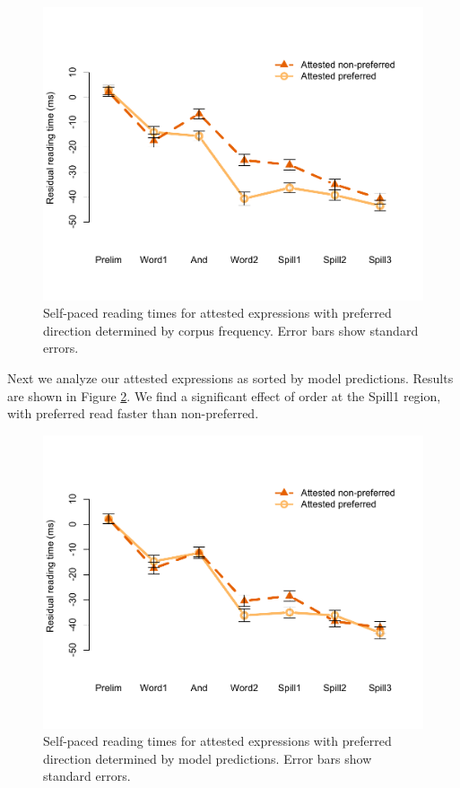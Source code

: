 \documentclass[authoryear]{elsarticle}
\begin{document}
\begin{figure}[t]
\includegraphics[scale=0.8]{spr-attested-sc.pdf}
\caption{Self-paced reading times for attested expressions with preferred direction determined by corpus frequency. Error bars show standard errors.} \label{fig:spr-attested-sc}
\end{figure}

Next we analyze our attested expressions as sorted by model predictions. Results are shown in Figure \ref{fig:spr-attested-model}. We find a significant effect of order at the Spill1 region, with preferred read faster than non-preferred.

\begin{figure}[t]
\includegraphics[scale=0.8]{spr-attested-model.pdf}
\caption{Self-paced reading times for attested expressions with preferred direction determined by model predictions. Error bars show standard errors.} \label{fig:spr-attested-model}
\end{figure}
\end{document}
